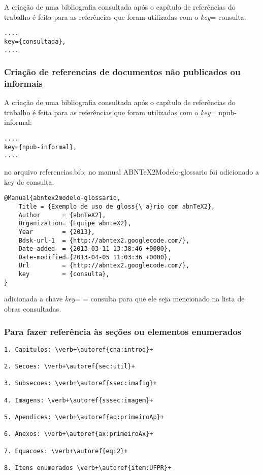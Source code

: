 A criação de uma bibliografia consultada após o capítulo de referências do trabalho é feita para as referências que foram utilizadas com o \textit{key}= {consulta}:

\begin{lstlisting}
....
key={consultada},
....
\end{lstlisting}  


\subsubsection{Criação de referencias de documentos não publicados ou informais}

A criação de uma bibliografia consultada após o capítulo de referências do trabalho é feita para as referências que foram utilizadas com o \textit{key}= {npub-informal}:

\begin{lstlisting}
....
key={npub-informal},
....
\end{lstlisting}  


no arquivo referencias.bib, no manual ABNTeX2Modelo-glossario foi adicionado a key de consulta.

\begin{lstlisting}
@Manual{abntex2modelo-glossario,
	Title = {Exemplo de uso de gloss{\'a}rio com abnTeX2},
	Author      = {abnTeX2},
	Organization= {Equipe abnteX2},
	Year        = {2013},
	Bdsk-url-1  = {http://abntex2.googlecode.com/},
	Date-added  = {2013-03-11 13:38:46 +0000},
	Date-modified={2013-04-05 11:03:36 +0000},
	Url         = {http://abntex2.googlecode.com/},
	key         = {consulta},
}
\end{lstlisting}

adicionada a chave \textit{key}= = {consulta} para que ele seja mencionado na lista de obras consultadas.


\subsubsection{Para fazer referência às seções ou elementos enumerados}

\begin{lstlisting}
1. Capitulos: \verb+\autoref{cha:introd}+ 

2. Secoes: \verb+\autoref{sec:util}+ 

3. Subsecoes: \verb+\autoref{ssec:imafig}+

4. Imagens: \verb+\autoref{sssec:imagem}+ 

5. Apendices: \verb+\autoref{ap:primeiroAp}+ 
          
6. Anexos: \verb+\autoref{ax:primeiroAx}+ 
          
7. Equacoes: \verb+\autoref{eq:2}+

8. Itens enumerados \verb+\autoref{item:UFPR}+ 
	
\end{lstlisting}
